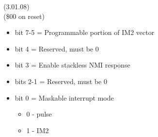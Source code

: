  (3.01.08)\\
(\$00 on reset)
\begin{itemize}
\item bit 7-5 = Programmable portion of IM2 vector
\item bit 4 = Reserved, must be 0
\item bit 3 = Enable stackless NMI response
\item bits 2-1 = Reserved, must be 0
\item bit 0 = Maskable interrupt mode
\begin{itemize}
\item[] 0 - pulse
\item[] 1 - IM2
\end{itemize}
\end{itemize}
